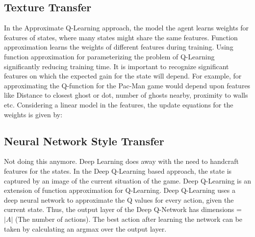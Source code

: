 \documentclass[10pt,twocolumn,letterpaper]{article}
\begin{document}
\subsection{Texture Transfer}

In the Approximate Q-Learning approach, the model the agent learns weights for features of states, where many states might share the same features. Function approximation learns the weights of different features during training. Using function approximation for parameterizing the problem of Q-Learning significantly reducing training time. It is important to recognize significant features on which the expected gain for the state will depend. For example, for approximating the Q-function for the Pac-Man game would depend upon features like Distance to closest ghost or dot, number of ghosts nearby, proximity to walls etc. Considering a linear model in the features, the update equations for the weights is given by:

    
    
\subsection{Neural Network Style Transfer}
Not doing this anymore.
Deep Learning does away with the need to handcraft features for the states. In the Deep Q-Learning based approach, the state is captured by an image of the current situation of the game. %
Deep Q-Learning is an extension of function approximation for Q-Learning. Deep Q-Learning uses a deep neural network to approximate the Q values for every action, given the current state. Thus, the output layer of the Deep Q-Network has dimensions = $|A|$ (The number of actions). The best action after learning the network can be taken by calculating an argmax over the output layer. 
\end{document}
